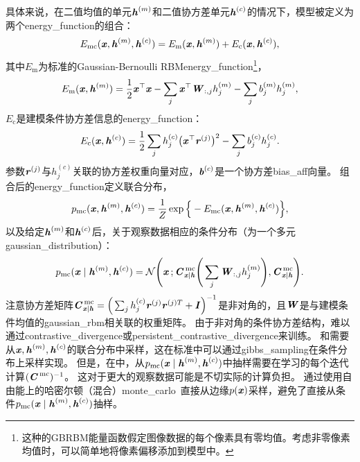 具体来说，在二值均值的单元$\Vh^{(m)}$和二值协方差单元$\Vh^{(c)}$的情况下，模型被定义为
两个\gls{energy_function}的组合：
\begin{align}
 E_{\text{mc}}(\Vx, \Vh^{(m)}, \Vh^{(c)}) = E_{\text{m}}(\Vx, \Vh^{(m)}) + E_{\text{c}}(\Vx, \Vh^{(c)}),
\end{align}
其中$E_{\text{m}}$为标准的Gaussian-Bernoulli RBM\gls{energy_function}\footnote{这种的\gls{GBRBM}能量函数假定图像数据的每个像素具有零均值。考虑非零像素均值时，可以简单地将像素偏移添加到模型中。}，
\begin{align} \label{eq:2044e}
E_{\text{m}}(\Vx, \Vh^{(m)}) = \frac{1}{2}\Vx^\top \Vx - \sum_j \Vx^\top \MW_{:,j} h_j^{(m)} - \sum_j 
 b_j^{(m)} h_j^{(m)},
\end{align}
$E_{\text{c}}$是建模条件协方差信息的\gls{energy_function}：
\begin{align}
 E_{\text{c}}(\Vx, \Vh^{(c)}) = \frac{1}{2} \sum_j h_j^{(c)} \big( \Vx^\top \Vr^{(j)}\big)^2 - \sum_j 
 b_j^{(c)} h_j^{(c)}.
\end{align}
参数$\Vr^{(j)}$与$h_j^{(c)}$关联的协方差权重向量对应，$\Vb^{(c)}$是一个协方差\gls{bias_aff}向量。
组合后的\gls{energy_function}定义联合分布，
\begin{align}
 p_{\text{mc}}(\Vx, \Vh^{(m)}, \Vh^{(c)}) = \frac{1}{Z} \exp \Big\{ -E_{\text{mc}}(\Vx, \Vh^{(m)}, 
 \Vh^{(c)}) \Big\},
\end{align}
以及给定$\Vh^{(m)}$和$\Vh^{(c)}$后，关于观察数据相应的条件分布（为一个多元\gls{gaussian_distribution}）：
\begin{align}
 p_{\text{mc}}(\Vx \mid \Vh^{(m)}, \Vh^{(c)})  = \CalN \Bigg( \Vx \,; \MC_{\Vx \mid \Vh}^{\,\text{mc}} \Bigg(
\sum_j \MW_{:,j}h_j^{(m)} \Bigg), \MC_{\Vx \mid \Vh}^{\,\text{mc}}
 \Bigg).
\end{align}
注意协方差矩阵$\MC_{\Vx \mid \Vh}^{\,\text{mc}} = \Big( \sum_j h_j^{(c)} \Vr^{(j)} \Vr^{(j)T} + \MI
\Big)^{-1}$是非对角的，且$\MW$是与建模条件均值的\gls{gaussian_rbm}相关联的权重矩阵。
由于非对角的条件协方差结构，难以通过\gls{contrastive_divergence}或\gls{persistent_contrastive_divergence}来训练。
和需要从$\Vx,\Vh^{(m)},\Vh^{(c)}$的联合分布中采样，这在标准中可以通过\gls{gibbs_sampling}在条件分布上采样实现。
但是，在中，从$ p_{\text{mc}}(\Vx  \mid \Vh^{(m)}, \Vh^{(c)}) $中抽样需要在学习的每个迭代计算$(\MC^{\,\text{mc}})^{-1}$。
这对于更大的观察数据可能是不切实际的计算负担。
\citet{Ranzato2010b-short}通过使用自由能上的哈密尔顿（混合）\gls{monte_carlo}~\citep{Neal93b}直接从边缘$p(\Vx)$采样，避免了直接从条件$  p_{\text{mc}}(\Vx  \mid \Vh^{(m)}, \Vh^{(c)}) $抽样。

